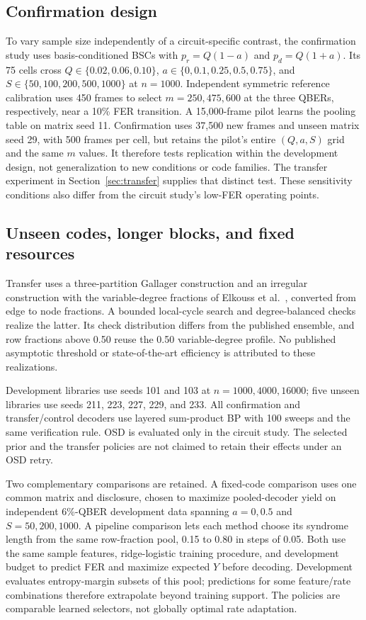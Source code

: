 \subsection{Confirmation design}
To vary sample size independently of a circuit-specific contrast, the confirmation study uses
basis-conditioned BSCs with $p_r=Q(1-a)$ and $p_d=Q(1+a)$. Its 75 cells cross
$Q\in\{0.02,0.06,0.10\}$, $a\in\{0,0.1,0.25,0.5,0.75\}$, and
$S\in\{50,100,200,500,1000\}$ at $n=1000$. Independent symmetric reference
calibration uses 450 frames to select $m=250,475,600$ at the three QBERs, respectively,
near a 10\% FER transition. A 15,000-frame pilot learns the pooling table on matrix
seed 11. Confirmation uses 37,500 new frames and unseen matrix seed 29, with 500
frames per cell, but retains the pilot's entire $(Q,a,S)$ grid and the same $m$
values. It therefore tests replication within the development design, not generalization
to new conditions or code families. The transfer experiment in
Section~\ref{sec:transfer} supplies that distinct test. These sensitivity conditions
also differ from the circuit study's low-FER operating points.

\subsection{Unseen codes, longer blocks, and fixed resources}
Transfer uses a three-partition Gallager construction and an irregular construction with
the variable-degree fractions of Elkouss et al.~\cite{elkouss2009}, converted from edge
to node fractions. A bounded local-cycle search and degree-balanced checks realize the
latter. Its check distribution differs from the published ensemble, and row fractions
above 0.50 reuse the 0.50 variable-degree profile. No published asymptotic threshold or
state-of-the-art efficiency is attributed to these realizations.

Development libraries use seeds 101 and 103 at $n=1000,4000,16000$; five unseen
libraries use seeds 211, 223, 227, 229, and 233. All confirmation and transfer/control
decoders use layered sum-product BP with 100 sweeps and the same verification rule.
OSD is evaluated only in the circuit study. The selected prior and the transfer policies
are not claimed to retain their effects under an OSD retry.

Two complementary comparisons are retained. A fixed-code comparison uses one common
matrix and disclosure, chosen to maximize pooled-decoder yield on independent 6\%-QBER
development data spanning $a=0,0.5$ and $S=50,200,1000$. A pipeline comparison lets
each method choose its syndrome length from the same row-fraction pool, 0.15 to 0.80
in steps of 0.05. Both use the same sample features, ridge-logistic training procedure,
and development budget to predict FER and maximize expected $Y$ before decoding.
Development evaluates entropy-margin subsets of this pool; predictions for some
feature/rate combinations therefore extrapolate beyond training support. The policies
are comparable learned selectors, not globally optimal rate adaptation.


